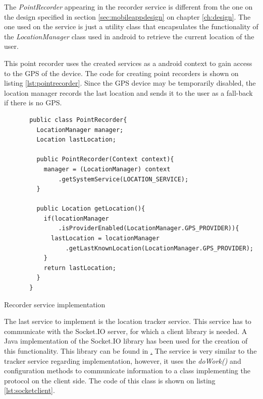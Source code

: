The \textit{PointRecorder} appearing in the recorder service is different from the one on the design specified in section \ref{sec:mobileappdesign} on chapter \ref{ch:design}. The one used on the service is just a utility class that encapsulates the functionality of the \textit{LocationManager} class used in android to retrieve the current location of the user. 

This point recorder uses the created services as a android context to gain access to the GPS of the device. The code for creating point recorders is shown on listing \ref{lst:pointrecorder}. Since the GPS device may be temporarily disabled, the location manager records the last location and sends it to the user as a fall-back if there is no GPS.

\begin{listing}[ht]\centering
  \begin{minipage}{.8\textwidth}
    \begin{verbatim}
       public class PointRecorder{
         LocationManager manager;
         Location lastLocation;
       
         public PointRecorder(Context context){
           manager = (LocationManager) context
               .getSystemService(LOCATION_SERVICE);
         }
         
         public Location getLocation(){
           if(locationManager
               .isProviderEnabled(LocationManager.GPS_PROVIDER)){
             lastLocation = locationManager
                 .getLastKnownLocation(LocationManager.GPS_PROVIDER);    
           }
           return lastLocation;
         }
       }
    \end{verbatim}
  \end{minipage}
  \caption{Recorder service implementation}\label{lst:pointrecorder}
\end{listing}

The last service to implement is the location tracker service. This service has to communicate with the Socket.IO server, for which a client library is needed. A Java implementation of the Socket.IO library has been used for the creation of this functionality. This library can be found in \href{https://github.com/Gottox/socket.io-java-client}. The service is very similar to the tracker service regarding implementation, however, it uses the \textit{doWork()} and configuration methods to communicate information to a class implementing the protocol on the client side. The code of this class is shown on listing \ref{lst:socketclient}.

